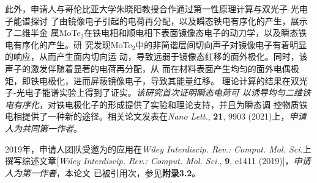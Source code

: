 此外，申请人与哥伦比亚大学朱晓阳教授合作通过第一性原理计算与双光子-光电子能谱探讨
了由镜像电子引起的电荷再分配，以及瞬态铁电有序化的产生，展示了二维半金
属MoTe$_2$在铁电相和顺电相下表面镜像态电子的动力学，以及瞬态铁电有序化的产生。研
究发现MoTe$_2$中的非简谐层间切向声子对镜像电子有着明显的响应，从而产生面内切向运
动，导致远弱于镜像态红移的面外极化。同时，该声子的激发伴随着显著的电荷再分配，从
而在材料表面产生均匀的面外电偶极矩，即铁电极化，进而屏蔽镜像电子，导致其能量红移。
理论计算的结果在双光子-光电子能谱实验上得到了证实。\emph{该研究首次证明瞬态电荷可
  以诱导均匀二维铁电有序化}，对铁电极化子的形成提供了实验和理论支持，并且为瞬态调
控物质铁电相提供了一种新的途径。相关论文发表在\textit{Nano Lett.}, \textbf{21},
9903 (2021)上，\emph{申请人为共同第一作者}。


2019年，申请人团队受邀为\hnamd{}的应用在\textit{Wiley Interdiscip. Rev.:
  Comput. Mol. Sci.}上撰写综述文章[\textit{Wiley Interdiscip. Rev.:
  Comput. Mol. Sci.}, \textbf{9}, e1411 (2019)]，\emph{申请人为第一作者}，本论文
已被引用次，参见\textbf{附录3.2}。

